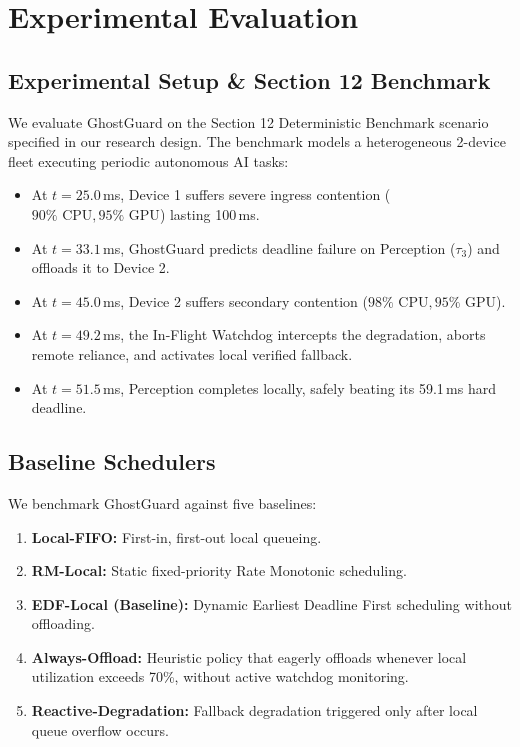 \documentclass[10pt,conference]{IEEEtran}
\begin{document}


\section{Experimental Evaluation}
\label{sec:eval}

\subsection{Experimental Setup & Section 12 Benchmark}
We evaluate GhostGuard on the Section 12 Deterministic Benchmark scenario specified in our research design. The benchmark models a heterogeneous 2-device fleet executing periodic autonomous AI tasks:
\begin{itemize}
    \item At $t = 25.0$\,ms, Device 1 suffers severe ingress contention ($90\%\text{ CPU}, 95\%\text{ GPU}$) lasting 100\,ms.
    \item At $t = 33.1$\,ms, GhostGuard predicts deadline failure on Perception ($\tau_3$) and offloads it to Device 2.
    \item At $t = 45.0$\,ms, Device 2 suffers secondary contention ($98\%\text{ CPU}, 95\%\text{ GPU}$).
    \item At $t = 49.2$\,ms, the In-Flight Watchdog intercepts the degradation, aborts remote reliance, and activates local verified fallback.
    \item At $t = 51.5$\,ms, Perception completes locally, safely beating its 59.1\,ms hard deadline.
\end{itemize}

\subsection{Baseline Schedulers}
We benchmark GhostGuard against five baselines:
\begin{enumerate}
    \item \textbf{Local-FIFO:} First-in, first-out local queueing.
    \item \textbf{RM-Local:} Static fixed-priority Rate Monotonic scheduling.
    \item \textbf{EDF-Local (Baseline):} Dynamic Earliest Deadline First scheduling without offloading.
    \item \textbf{Always-Offload:} Heuristic policy that eagerly offloads whenever local utilization exceeds 70\%, without active watchdog monitoring.
    \item \textbf{Reactive-Degradation:} Fallback degradation triggered only after local queue overflow occurs.
\end{enumerate}
\end{document}
